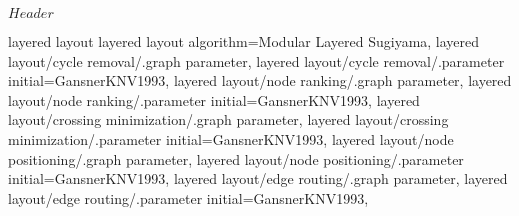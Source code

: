 %
%
%

\ProvidesFileRCS[v\pgfversion] $Header$






%
%




%
%
\pgfgddeclarealgorithmkey
  {layered layout}
  {layered layout}
  {
    algorithm=Modular Layered Sugiyama,
    layered layout/cycle removal/.graph parameter,
    layered layout/cycle removal/.parameter initial=GansnerKNV1993,
    layered layout/node ranking/.graph parameter,
    layered layout/node ranking/.parameter initial=GansnerKNV1993,
    layered layout/crossing minimization/.graph parameter,
    layered layout/crossing minimization/.parameter initial=GansnerKNV1993,
    layered layout/node positioning/.graph parameter,
    layered layout/node positioning/.parameter initial=GansnerKNV1993,
    layered layout/edge routing/.graph parameter,
    layered layout/edge routing/.parameter initial=GansnerKNV1993,
  }




\endinput
